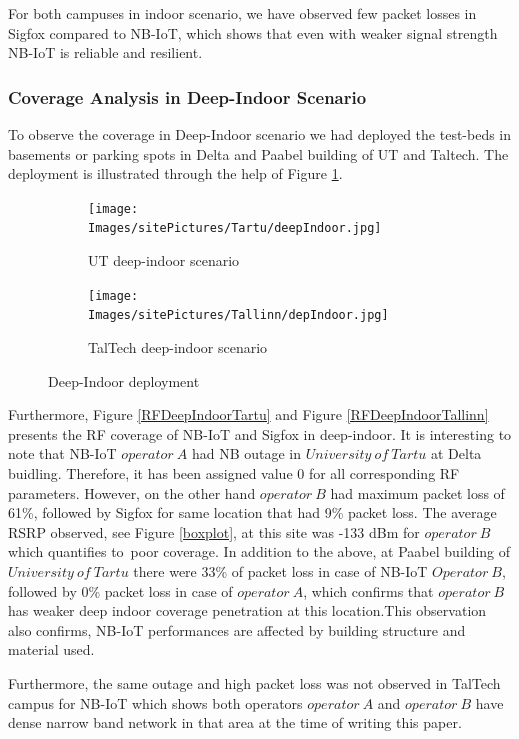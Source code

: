 \documentclass[12pt]{article}
\begin{document}
For both campuses in indoor scenario, we have observed few packet losses in Sigfox compared to NB-IoT, which shows that even with weaker signal strength NB-IoT is reliable and resilient.\par

\subsubsection{Coverage Analysis in Deep-Indoor Scenario} \label{deep-indoor analysis}
To observe the coverage in Deep-Indoor scenario we had deployed the test-beds in basements or parking spots in Delta and Paabel building of UT and Taltech. The deployment is illustrated through the help of Figure \ref{fig:Deep-Indoor deployment}.

\begin{figure}[H]
\centering
\begin{subfigure}[t]{0.42 \columnwidth}
  \centering
  \texttt{[image: Images/sitePictures/Tartu/deepIndoor.jpg]}
  \caption{UT deep-indoor scenario}
  \end{subfigure}
  
  \begin{subfigure}[t]{0.42 \columnwidth}
    \centering
    \texttt{[image: Images/sitePictures/Tallinn/depIndoor.jpg]}
    \caption{TalTech deep-indoor scenario}
  \end{subfigure}
   
    \caption{Deep-Indoor deployment}
    \label{fig:Deep-Indoor deployment}
\end{figure}

Furthermore, Figure \ref{RFDeepIndoorTartu} and Figure \ref{RFDeepIndoorTallinn} presents the RF coverage of NB-IoT and Sigfox in deep-indoor. It is interesting to note that NB-IoT $operator\ A$ had NB outage in $University\ of\ Tartu$ at Delta buidling. Therefore, it has been assigned value 0 for all corresponding RF parameters. However, on the other hand $operator\ B$ had maximum packet loss of 61\%, followed by Sigfox for same location that had 9\% packet loss. The average RSRP observed, see Figure \ref{boxplot}, at this site was -133 dBm for $operator\ B$ which quantifies to\ poor coverage. In addition to the above, at Paabel building of $University\ of\ Tartu$ there were 33\% of packet loss in case of NB-IoT $Operator\ B$, followed by 0\% packet loss in case of $operator\  A$, which confirms that $operator\ B$ has weaker deep indoor coverage penetration at this location.This observation also confirms, NB-IoT performances are affected by building structure and material used.\par
Furthermore, the same outage and high packet loss was not observed in TalTech campus for NB-IoT which shows both operators $operator\ A$ and $operator\ B$ have dense narrow band network in that area at the time of writing this paper.
\end{document}
